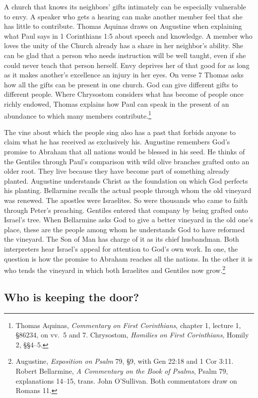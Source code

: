 A church that knows its neighbors' gifts intimately can be especially vulnerable to envy. A speaker who gets a hearing can make another member feel that she has little to contribute. Thomas Aquinas draws on Augustine when explaining what Paul says in 1 Corinthians 1:5 about speech and knowledge. A member who loves the unity of the Church already has a share in her neighbor's ability. She can be glad that a person who needs instruction will be well taught, even if she could never teach that person herself. Envy deprives her of that good for as long as it makes another's excellence an injury in her eyes. On verse 7 Thomas asks how all the gifts can be present in one church. God can give different gifts to different people. Where Chrysostom considers what has become of people once richly endowed, Thomas explains how Paul can speak in the present of an abundance to which many members contribute.\footnote{Thomas Aquinas, \textit{Commentary on First Corinthians}, chapter 1, lecture 1, §86234, on vv.~5 and 7. Chrysostom, \textit{Homilies on First Corinthians}, Homily 2, §§4--5.}

The vine about which the people sing also has a past that forbids anyone to claim what he has received as exclusively his. Augustine remembers God's promise to Abraham that all nations would be blessed in his seed. He thinks of the Gentiles through Paul's comparison with wild olive branches grafted onto an older root. They live because they have become part of something already planted. Augustine understands Christ as the foundation on which God perfects his planting. Bellarmine recalls the actual people through whom the old vineyard was renewed. The apostles were Israelites. So were thousands who came to faith through Peter's preaching. Gentiles entered that company by being grafted onto Israel's tree. When Bellarmine asks God to give a better vineyard in the old one's place, these are the people among whom he understands God to have reformed the vineyard. The Son of Man has charge of it as its chief husbandman. Both interpreters hear Israel's appeal for attention to God's own work. In one, the question is how the promise to Abraham reaches all the nations. In the other it is who tends the vineyard in which both Israelites and Gentiles now grow.\footnote{Augustine, \textit{Exposition on Psalm} 79, §9, with Gen 22:18 and 1 Cor 3:11. Robert Bellarmine, \textit{A Commentary on the Book of Psalms}, Psalm 79, explanations 14--15, trans. John O'Sullivan. Both commentators draw on Romans 11.}

\subsection{Who is keeping the door?}

